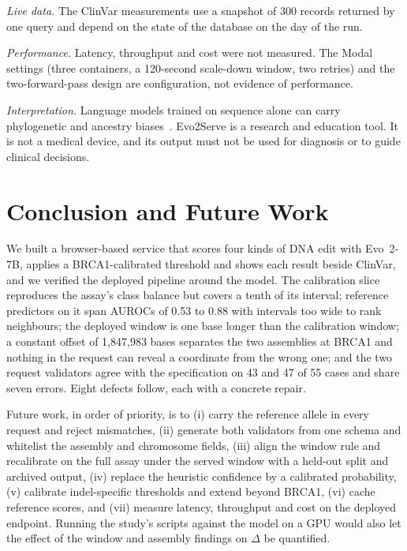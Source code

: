 \documentclass[10pt,journal,a4paper]{IEEEtran}
\begin{document}
\textit{Live data.} The ClinVar measurements use a snapshot of 300 records returned by one query and depend on the state of the database on the day of the run.

\textit{Performance.} Latency, throughput and cost were not measured. The Modal settings (three containers, a 120-second scale-down window, two retries) and the two-forward-pass design are configuration, not evidence of performance.

\textit{Interpretation.} Language models trained on sequence alone can carry phylogenetic and ancestry biases~\cite{pugh2025likelihood,pathak2024ancestry}. Evo2Serve is a research and education tool. It is not a medical device, and its output must not be used for diagnosis or to guide clinical decisions.

\section{Conclusion and Future Work}
\label{sec:conclusion}

We built a browser-based service that scores four kinds of DNA edit with Evo~2-7B, applies a BRCA1-calibrated threshold and shows each result beside ClinVar, and we verified the deployed pipeline around the model. The calibration slice reproduces the assay's class balance but covers a tenth of its interval; reference predictors on it span AUROCs of 0.53 to 0.88 with intervals too wide to rank neighbours; the deployed window is one base longer than the calibration window; a constant offset of 1{,}847{,}983 bases separates the two assemblies at BRCA1 and nothing in the request can reveal a coordinate from the wrong one; and the two request validators agree with the specification on 43 and 47 of 55 cases and share seven errors. Eight defects follow, each with a concrete repair.

Future work, in order of priority, is to (i) carry the reference allele in every request and reject mismatches, (ii) generate both validators from one schema and whitelist the assembly and chromosome fields, (iii) align the window rule and recalibrate on the full assay under the served window with a held-out split and archived output, (iv) replace the heuristic confidence by a calibrated probability, (v) calibrate indel-specific thresholds and extend beyond BRCA1, (vi) cache reference scores, and (vii) measure latency, throughput and cost on the deployed endpoint. Running the study's scripts against the model on a GPU would also let the effect of the window and assembly findings on $\Delta$ be quantified.
\end{document}
